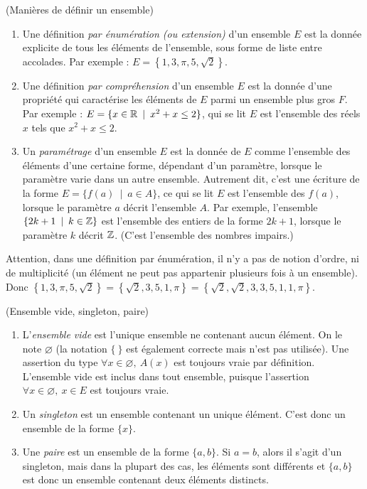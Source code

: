 \begin{definition}(Manières de définir un ensemble)

\begin{enumerate}
\item Une définition \emph{par énumération (ou extension)} d'un ensemble $E$ est la donnée explicite de tous les éléments de l'ensemble, sous forme de liste entre accolades. Par exemple : $E = \left\{1,3,\pi,5,\sqrt2\right\}$.
\item Une définition \emph{par compréhension} d'un ensemble $E$ est la donnée d'une propriété qui caractérise les éléments de $E$ parmi un ensemble plus gros $F$. Par exemple : $E = \{x\in \R\:\mid\: x^2+x\leq 2\}$, qui se lit \og$E$ est l'ensemble des réels $x$ tels que $x^2+x\leq 2$\fg.
\item Un \emph{paramétrage} d'un ensemble $E$ est la donnée de $E$ comme l'ensemble des éléments d'une certaine forme, dépendant d'un paramètre, lorsque le paramètre varie dans un autre ensemble. Autrement dit, c'est une écriture de la forme $E = \{f(a)\:\mid\: a\in A\}$, ce qui se lit \og $E$ est l'ensemble des $f(a)$, lorsque le paramètre $a$ décrit l'ensemble $A$\fg. Par exemple, l'ensemble $\{2k+1\:\mid\: k\in \Z\}$ est l'ensemble des entiers de la forme $2k+1$, lorsque le paramètre $k$ décrit $\mathbb{Z}$. (C'est l'ensemble des nombres impairs.)
\end{enumerate}
\end{definition}



Attention, dans une définition par énumération, il n'y a pas de notion d'ordre, ni de multiplicité (un élément ne peut pas appartenir \og plusieurs fois\fg{} à un ensemble). Donc  $\left\{1,3,\pi,5,\sqrt2\right\} = \left\{\sqrt 2, 3,5,1,\pi\right\}=\left\{\sqrt 2,\sqrt 2, 3,  3,5,1,1,\pi\right\}$.

\begin{definition}(Ensemble vide, singleton, paire)
\begin{enumerate}
\item L'\emph{ensemble vide} est l'unique ensemble ne contenant aucun élément. On le note $\varnothing$ (la notation $\{\:\}$ est également correcte mais n'est pas utilisée). Une assertion du type \og $\forall x\in \varnothing, \: A(x)$\fg{} est toujours vraie par définition. L'ensemble vide est inclus dans tout ensemble, puisque l'assertion \og $\forall x\in \varnothing, \: x\in E$\fg{} est toujours vraie.
\item Un \emph{singleton} est un ensemble contenant un unique élément. C'est donc un ensemble de la forme $\{x\}$.
\item Une \emph{paire} est un ensemble de la forme $\{a,b\}$. Si $a=b$, alors il s'agit d'un singleton, mais dans la plupart des cas, les éléments sont différents et $\{a,b\}$ est donc un ensemble contenant deux éléments distincts.
\end{enumerate}
\end{definition}

